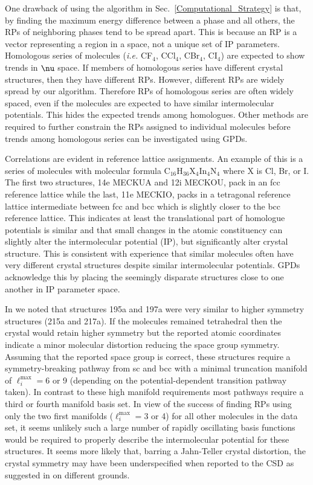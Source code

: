 \documentclass[preprint]{iucr}              %
\newcommand{\mb}[1]{\ensuremath{\mbox{\boldmath $ #1 $}}}
\begin{document}
One drawback of using the algorithm in
Sec.~\ref{Computational_Strategy} is that, by finding the maximum
energy difference between a phase and all others, the RPs of
neighboring phases tend to be spread apart.  This is because an RP
is a vector representing a region in a space, not a unique set of IP
parameters.  Homologous series of molecules (\emph{i.e.} CF$_4$,
CCl$_4$, CBr$_4$, CI$_4$) are expected to show trends in $\mb{\nu}$
space. If members of homologous series have different crystal
structures, then they have different RPs. However, different RPs
are widely spread by our algorithm. Therefore RPs of homologous
series are often widely spaced, even if the molecules are expected
to have similar intermolecular potentials. This hides the expected
trends among homologues.  Other methods are required to further constrain the
RPs assigned to individual molecules before trends among homologous series can
be investigated using GPDs.

Correlations are evident in reference lattice assignments.
An example of this is a series of molecules with molecular formula
$\mathrm{C}_{16}\mathrm{H}_{36}\mathrm{X}_{4}\mathrm{In}_4\mathrm{N}_4$
where $\mathrm{X}$ is Cl, Br, or I. The first two structures, 14e
MECKUA and 12i MECKOU,
pack in an fcc reference lattice while
the last, 11e MECKIO, packs in a tetragonal reference lattice intermediate
between fcc and
bcc which is slightly closer to the bcc reference lattice. This
indicates at least the translational part of homologue potentials is
similar and that small changes in the atomic constituency can
slightly alter the intermolecular potential (IP), but significantly
alter crystal structure. This is consistent with experience that
similar molecules often have very different crystal structures
despite similar intermolecular potentials. GPDs acknowledge this by
placing the seemingly disparate structures close to one another in
IP parameter space.

In \cite{McClurg09} we noted that structures 195a and 197a were very
similar to higher symmetry structures (215a and 217a). If the
molecules remained tetrahedral then the crystal would retain higher
symmetry but the reported atomic coordinates indicate a minor
molecular distortion reducing the space group symmetry. Assuming
that the reported space group is correct, these structures require a
symmetry-breaking pathway from sc and bcc with a minimal truncation
manifold of $\ell_i^{\mathrm{max}}=6$ or 9 (depending on the
potential-dependent transition pathway taken). In contrast to these
high manifold requirements most pathways require a third or fourth
manifold basis set. In view of the success of finding RPs using
only the two first manifolds ($\ell_i^{\mathrm{max}}=3$ or 4) for
all other molecules in the data set, it seems unlikely such a large
number of rapidly oscillating basis functions would be required to
properly describe the intermolecular potential for these structures.
It seems more likely that, barring a Jahn-Teller crystal distortion,
the crystal symmetry may have been underspecified when reported to
the CSD as suggested in \cite{McClurg09} on different grounds.
\end{document}

